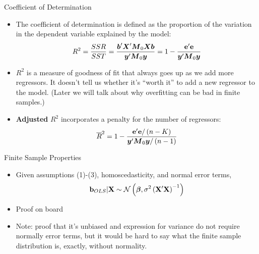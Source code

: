 \documentclass[english,xcolor={dvipsnames},aspectratio=169]{beamer}
\begin{document}
\begin{frame}{Coefficient of Determination}
\begin{itemize}
	\item The coefficient of determination is defined as the proportion of the variation in the dependent variable
	explained by the model:\[
	R^{2} = \frac{SSR}{SST} =  \frac{\boldsymbol{b}'\boldsymbol{X}'\boldsymbol{M}_{0}\boldsymbol{X}\boldsymbol{b}}{\boldsymbol{y}'\boldsymbol{M}_{0}\boldsymbol{y}}
	= 1 -  \frac{{\bf e}'{\bf e}}{\boldsymbol{y}'\boldsymbol{M}_{0}\boldsymbol{y}}
\]

	\smallskip
	\item $R^{2}$ is a measure of goodness of fit that always goes up as we add more regressors. It doesn't 
	tell us whether it's ``worth it'' to add a new regressor to the model. (Later we will talk about why overfitting
	can be bad in finite samples.)

\smallskip
	\item {\bf Adjusted} $R^{2}$ incorporates a penalty for the number of regressors:
	\[
	\overline{R}^{2} 	= 1 -  \frac{{\bf e}'{\bf e}/\left(n-K\right)}{\boldsymbol{y}'\boldsymbol{M}_{0}\boldsymbol{y}/\left(n-1\right)}
	\]
\end{itemize}
\end{frame}




\begin{frame}{Finite Sample Properties}
\begin{itemize}
	\item Given assumptions (1)-(3), homoscedasticity, and normal error terms, \[
	{\bf b}_{OLS} | {\bf X} \sim \mathcal{N}\left(\boldsymbol{\beta},\sigma^{2} \left({\bf X}'{\bf X}  \right)^{-1} \right)
	\]





	\item Proof on board

	\item Note: proof that it's unbiased and expression for variance
	do not require normally error terms, but it would be hard to say what the finite sample
	distribution is, exactly, without normality. 

\end{itemize}
\end{frame}
\end{document}
